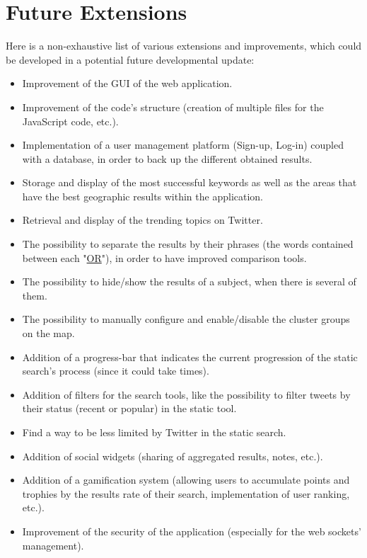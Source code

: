\documentclass[a4paper,11pt]{report}
\begin{document}
\section{Future Extensions}
Here is a non-exhaustive list of various extensions and improvements, which could be developed in a potential future developmental update:
\begin{itemize}
	\item Improvement of the GUI of the web application.
	\item Improvement of the code's structure (creation of multiple files for the JavaScript code, etc.).
	\item Implementation of a user management platform (Sign-up, Log-in) coupled with a database, in order to back up the different obtained results.
	\item Storage and display of the most successful keywords as well as the areas that have the best geographic results within the application.
	\item Retrieval and display of the trending topics on Twitter.
	\item The possibility to separate the results by their phrases (the words contained between each "\underline{OR}"), in order to have improved comparison tools.
	\item The possibility to hide/show the results of a subject, when there is several of them.
	\item The possibility to manually configure and enable/disable the cluster groups on the map.
	\item Addition of a progress-bar that indicates the current progression of the static search's process (since it could take times).
	\item Addition of filters for the search tools, like the possibility to filter tweets by their status (recent or popular) in the static tool.
	\item Find a way to be less limited by Twitter in the static search.
	\item Addition of social widgets (sharing of aggregated results, notes, etc.).	
	\item Addition of a gamification system (allowing users to accumulate points and trophies by the results rate of their search, implementation of user ranking, etc.).
	\item Improvement of the security of the application (especially for the web sockets' management).
\end{itemize}
\newpage
\end{document}
